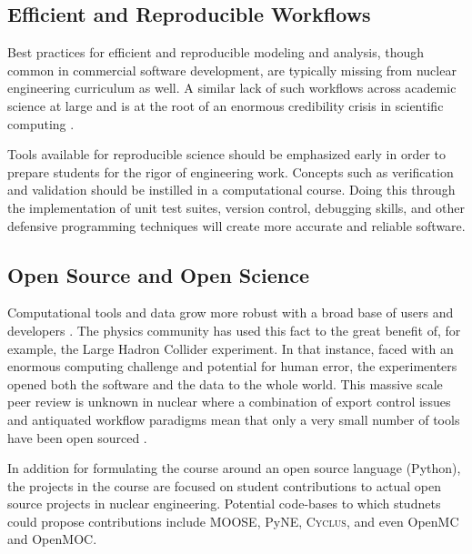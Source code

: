 \documentclass{anstrans}
\begin{document}
\subsection{Efficient and Reproducible Workflows}

Best practices for efficient and reproducible modeling and analysis, though
common in commercial software development, are typically missing from nuclear
engineering curriculum as well. A similar lack of such workflows across
academic science at large and is  at the root of an enormous credibility
crisis in scientific computing \cite{donoho_reproducible_2009,
stodden_scientific_2010}.

Tools available for reproducible science should be emphasized early in order to
prepare students for the rigor of engineering work. Concepts such as
verification and validation should be instilled in a computational course.
Doing this through the implementation of unit test suites, version control,
debugging skills, and other defensive programming techniques will create
more accurate and reliable software.

\subsection{Open Source and Open Science}

Computational tools and data grow more robust with a broad base of users and
developers \cite{petre_code_2014, wicherts_willingness_2011}. The physics
community has used this fact to the great benefit of, for example, the Large
Hadron Collider experiment. In that instance, faced with an enormous computing
challenge and potential for human error, the experimenters opened both the
software and the data to the whole world. This massive scale peer review is
unknown in nuclear where a combination of export control issues and antiquated
workflow paradigms mean that only a very small number of tools have been open
sourced \cite{gaston_moose:_2009}\cite{scopatz_pyne:_2012}\cite{carlsen_cyclus_2014}.

In addition for formulating the course around an open source language (Python),
the projects in the course are focused on student contributions to actual open source
projects in nuclear engineering. Potential code-bases to which studnets could
propose contributions include MOOSE\cite{gaston_moose:_2009},
PyNE\cite{scopatz_pyne:_2012}, \textsc{Cyclus}\cite{carlsen_cyclus_2014}, and
even OpenMC\cite{romano_openmc_2013} and OpenMOC\cite{boyd_openmoc_2014}.
\end{document}
